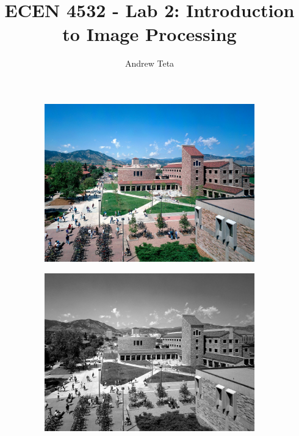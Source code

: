 \documentclass[11pt,a4paper]{article}
\author{Andrew Teta}
\title{ECEN 4532 - Lab 2: Introduction to Image Processing}
\begin{document}
\maketitle

\begin{figure}[ht]
	\centering
	\begin{subfigure}[h]{0.6\textwidth}
		\includegraphics[width=\textwidth]{images/test01}
	\end{subfigure}
	\begin{subfigure}[h]{0.6\textwidth}
		\includegraphics[width=\textwidth]{figs/test01_gray}
	\end{subfigure}
\end{figure}
\end{document}
